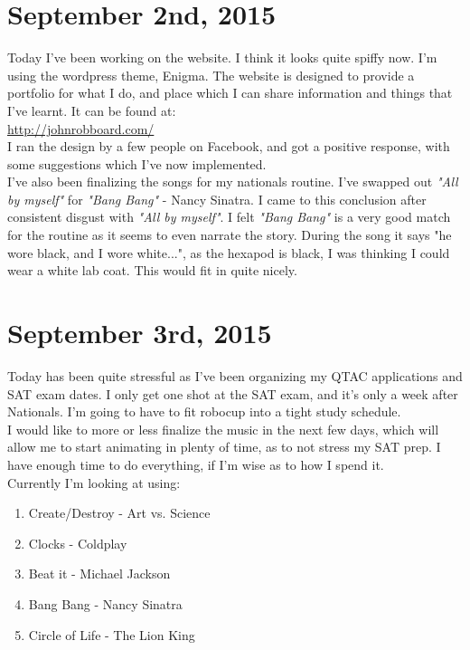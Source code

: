     	\section{September 2nd, 2015}
    		Today I've been working on the website. I think it looks quite spiffy now. I'm using the wordpress theme, Enigma. The website is designed to provide a portfolio for what I do, and place which I can share information and things that I've learnt. It can be found at:\\
    		
    		\url{http://johnrobboard.com/}\\
    		
    		I ran the design by a few people on Facebook, and got a positive response, with some suggestions which I've now implemented.\\
    		
    		I've also been finalizing the songs for my nationals routine. I've swapped out \textit{"All by myself"} for \textit{"Bang Bang"} - Nancy Sinatra. I came to this conclusion after consistent disgust with \textit{"All by myself"}. I felt \textit{"Bang Bang"} is a very good match for the routine as it seems to even narrate the story. During the song it says "he wore black, and I wore white...", as the hexapod is black, I was thinking I could wear a white lab coat. This would fit in quite nicely.\\
    		
    	\section{September 3rd, 2015}
    		Today has been quite stressful as I've been organizing my QTAC applications and SAT exam dates. I only get one shot at the SAT exam, and it's only a week after Nationals. I'm going to have to fit robocup into a tight study schedule.\\
    		
    		I would like to more or less finalize the music in the next few days, which will allow me to start animating in plenty of time, as to not stress my SAT prep. I have enough time to do everything, if I'm wise as to how I spend it.\\
    		
    		Currently I'm looking at using:\\	
    		
    		\begin{enumerate}
    			\item{Create/Destroy - Art vs. Science}
    			\item{Clocks - Coldplay}
    			\item{Beat it - Michael Jackson}
    			\item{Bang Bang - Nancy Sinatra}
    			\item{Circle of Life - The Lion King}
    		\end{enumerate}
            
